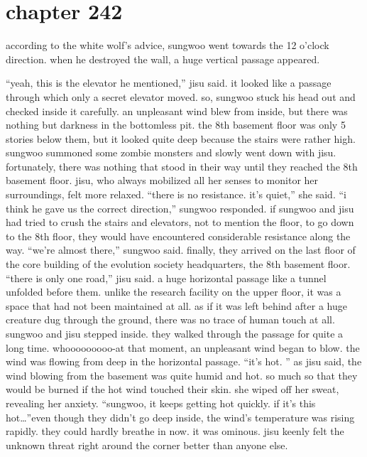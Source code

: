 \section{chapter 242}

                            according to the white wolf’s advice, sungwoo went towards the 12 o’clock direction.
 when he destroyed the wall, a huge vertical passage appeared.





“yeah, this is the elevator he mentioned,” jisu said.
it looked like a passage through which only a secret elevator moved.
so, sungwoo stuck his head out and checked inside it carefully.
 an unpleasant wind blew from inside, but there was nothing but darkness in the bottomless pit.
the 8th basement floor was only 5 stories below them, but it looked quite deep because the stairs were rather high.
sungwoo summoned some zombie monsters and slowly went down with jisu.
 fortunately, there was nothing that stood in their way until they reached the 8th basement floor.
jisu, who always mobilized all her senses to monitor her surroundings, felt more relaxed.
“there is no resistance.
 it’s quiet,” she said.
“i think he gave us the correct direction,” sungwoo responded.
if sungwoo and jisu had tried to crush the stairs and elevators, not to mention the floor, to go down to the 8th floor, they would have encountered considerable resistance along the way.
“we’re almost there,” sungwoo said.
finally, they arrived on the last floor of the core building of the evolution society headquarters, the 8th basement floor.
“there is only one road,” jisu said.
a huge horizontal passage like a tunnel unfolded before them.
 unlike the research facility on the upper floor, it was a space that had not been maintained at all.
as if it was left behind after a huge creature dug through the ground, there was no trace of human touch at all.
sungwoo and jisu stepped inside.
 they walked through the passage for quite a long time.
whooooooooo-at that moment, an unpleasant wind began to blow.
 the wind was flowing from deep in the horizontal passage.
“it’s hot.
”
as jisu said, the wind blowing from the basement was quite humid and hot.
so much so that they would be burned if the hot wind touched their skin.
she wiped off her sweat, revealing her anxiety.
“sungwoo, it keeps getting hot quickly.
 if it’s this hot…”even though they didn’t go deep inside, the wind’s temperature was rising rapidly.
 they could hardly breathe in now.
 it was ominous.
 jisu keenly felt the unknown threat right around the corner better than anyone else.
